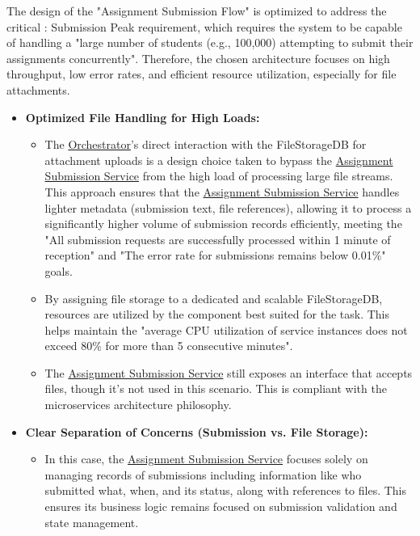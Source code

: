 \begin{justify}
    The design of the "Assignment Submission Flow" is optimized to address the critical : Submission Peak requirement, which requires the system to be capable of handling a "large number of students (e.g., 100,000) attempting to submit their assignments concurrently". Therefore, the chosen architecture focuses on high throughput, low error rates, and efficient resource utilization, especially for file attachments.
\end{justify}
\begin{itemize}
    \item \textbf{Optimized File Handling for High Loads:}
    \begin{itemize}
        \item The \hyperref[def:Orchestrator]{Orchestrator}'s direct interaction with the FileStorageDB for attachment uploads is a design choice taken to bypass the \hyperref[def:AssignmentSubmissionService]{Assignment Submission Service} from the high load of processing large file streams. This approach ensures that the \hyperref[def:AssignmentSubmissionService]{Assignment Submission Service} handles lighter metadata (submission text, file references), allowing it to process a significantly higher volume of submission records efficiently, meeting the "All submission requests are successfully processed within 1 minute of reception" and "The error rate for submissions remains below 0.01\%" goals.
        \item By assigning file storage to a dedicated and scalable FileStorageDB, resources are utilized by the component best suited for the task. This helps maintain the "average CPU utilization of service instances does not exceed 80\% for more than 5 consecutive minutes".
        \item The \hyperref[def:AssignmentSubmissionService]{Assignment Submission Service} still exposes an interface that accepts files, though it’s not used in this scenario. This is compliant with the microservices architecture philosophy.
    \end{itemize}
    \item \textbf{Clear Separation of Concerns (Submission vs. File Storage):}
    \begin{itemize}
        \item In this case, the \hyperref[def:AssignmentSubmissionService]{Assignment Submission Service} focuses solely on managing records of submissions including information like who submitted what, when, and its status, along with references to files. This ensures its business logic remains focused on submission validation and state management.

\end{itemize}
\end{itemize}
